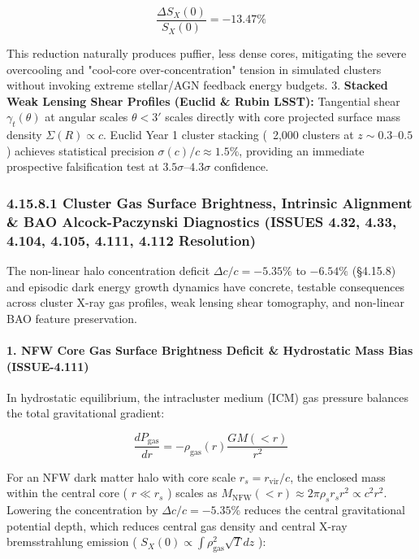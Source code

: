 \documentclass[11pt,a4paper]{article}
\theoremstyle{definition}\newtheorem{definition}{Definition}
\theoremstyle{remark}\newtheorem{remark}{Remark}
\begin{document}
\begin{equation}
\frac{\Delta S_X(0)}{S_X(0)} = -13.47\%
\end{equation}


This reduction naturally produces puffier, less dense cores, mitigating the severe overcooling and "cool-core over-concentration" tension in simulated clusters without invoking extreme stellar/AGN feedback energy budgets.
3. \textbf{Stacked Weak Lensing Shear Profiles (Euclid \& Rubin LSST):} Tangential shear $\gamma_t(\theta)$ at angular scales $\theta < 3'$ scales directly with core projected surface mass density $\Sigma(R) \propto c$. Euclid Year 1 cluster stacking (~2,000 clusters at $z \sim 0.3\text{--}0.5$ ) achieves statistical precision $\sigma(c)/c \approx 1.5\%$, providing an immediate prospective falsification test at $3.5\sigma\text{--}4.3\sigma$ confidence.
\subsubsection{4.15.8.1 Cluster Gas Surface Brightness, Intrinsic Alignment \& BAO Alcock-Paczynski Diagnostics (ISSUES 4.32, 4.33, 4.104, 4.105, 4.111, 4.112 Resolution)}

The non-linear halo concentration deficit $\Delta c/c = -5.35\%$ to $-6.54\%$ (§4.15.8) and episodic dark energy growth dynamics have concrete, testable consequences across cluster X-ray gas profiles, weak lensing shear tomography, and non-linear BAO feature preservation.
\paragraph{1. NFW Core Gas Surface Brightness Deficit \& Hydrostatic Mass Bias (ISSUE-4.111)}

In hydrostatic equilibrium, the intracluster medium (ICM) gas pressure balances the total gravitational gradient:


\begin{equation}
\frac{dP_{\text{gas}}}{dr} = -\rho_{\text{gas}}(r) \frac{G M(<r)}{r^2}
\end{equation}


For an NFW dark matter halo with core scale $r_s = r_{\text{vir}} / c$, the enclosed mass within the central core ( $r \ll r_s$ ) scales as $M_{\text{NFW}}(<r) \approx 2\pi \rho_s r_s r^2 \propto c^2 r^2$. Lowering the concentration by $\Delta c/c = -5.35\%$ reduces the central gravitational potential depth, which reduces central gas density and central X-ray bremsstrahlung emission ( $S_X(0) \propto \int \rho_{\text{gas}}^2 \sqrt{T} dz$ ):
\end{document}
